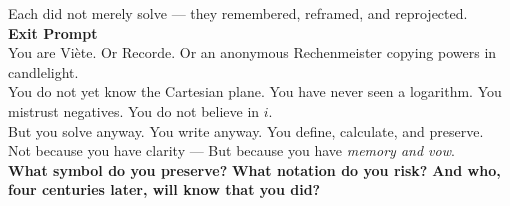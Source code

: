 \documentclass[9pt]{article}
\begin{document}
Each did not merely solve — they remembered, reframed, and reprojected.\\

\textbf{Exit Prompt}\\

You are Viète. Or Recorde. Or an anonymous Rechenmeister copying powers in candlelight.\\

You do not yet know the Cartesian plane.  
You have never seen a logarithm.  
You mistrust negatives.  
You do not believe in $i$.\\

But you solve anyway.  
You write anyway.  
You define, calculate, and preserve.\\

Not because you have clarity —  
But because you have \textit{memory and vow}.\\

\textbf{What symbol do you preserve?}  
\textbf{What notation do you risk?}  
\textbf{And who, four centuries later, will know that you did?}
\end{document}
